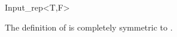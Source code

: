 \begin{ccRefClass}{Input_rep<T,F>}

\ccDefinition

The definition of  is completely symmetric to .



\end{ccRefClass}